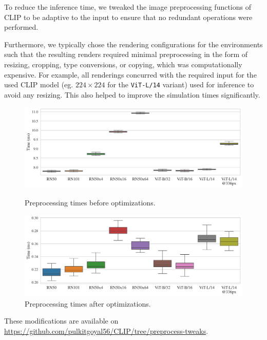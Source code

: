 To reduce the inference time, we tweaked the image preprocessing functions of CLIP to be adaptive to the input to ensure that no redundant operations were performed.

Furthermore, we typically chose the rendering configurations for the environments such that the resulting renders required minimal preprocessing in the form of resizing, cropping, type conversions, or copying, which was computationally expensive.
For example, all renderings concurred with the required input for the used CLIP model (eg. \(224 \times 224\) for the \texttt{ViT-L/14} variant) used for inference to avoid any resizing.
This also helped to improve the simulation times significantly.\\

\begin{figure}[H]
    \centering
    \includegraphics[width=\textwidth]{images/full_transform.pdf}\vspace{-15pt}
    \caption{Preprocessing times before optimizations.}\vspace{15pt}
    \includegraphics[width=\textwidth]{images/fast_transform.pdf}\vspace{-15pt}
    \caption{Preprocessing times after optimizations.}
    \label{fig:preprocessing-time-improvement}
\end{figure}

These modifications are available on \url{https://github.com/pulkitgoyal56/CLIP/tree/preprocess-tweaks}.




